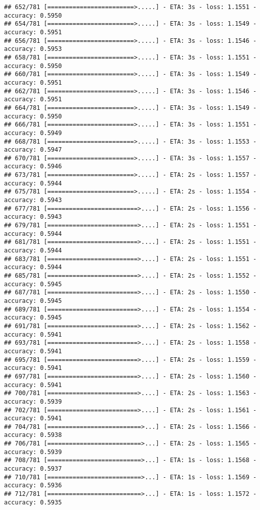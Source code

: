\documentclass[
]{article}
\begin{document}
\begin{verbatim}
## 652/781 [========================>.....] - ETA: 3s - loss: 1.1551 - accuracy: 0.5950
## 654/781 [========================>.....] - ETA: 3s - loss: 1.1549 - accuracy: 0.5951
## 656/781 [========================>.....] - ETA: 3s - loss: 1.1546 - accuracy: 0.5953
## 658/781 [========================>.....] - ETA: 3s - loss: 1.1551 - accuracy: 0.5950
## 660/781 [========================>.....] - ETA: 3s - loss: 1.1549 - accuracy: 0.5951
## 662/781 [========================>.....] - ETA: 3s - loss: 1.1546 - accuracy: 0.5951
## 664/781 [========================>.....] - ETA: 3s - loss: 1.1549 - accuracy: 0.5950
## 666/781 [========================>.....] - ETA: 3s - loss: 1.1551 - accuracy: 0.5949
## 668/781 [========================>.....] - ETA: 3s - loss: 1.1553 - accuracy: 0.5947
## 670/781 [========================>.....] - ETA: 3s - loss: 1.1557 - accuracy: 0.5946
## 673/781 [========================>.....] - ETA: 2s - loss: 1.1557 - accuracy: 0.5944
## 675/781 [========================>.....] - ETA: 2s - loss: 1.1554 - accuracy: 0.5943
## 677/781 [=========================>....] - ETA: 2s - loss: 1.1556 - accuracy: 0.5943
## 679/781 [=========================>....] - ETA: 2s - loss: 1.1551 - accuracy: 0.5944
## 681/781 [=========================>....] - ETA: 2s - loss: 1.1551 - accuracy: 0.5944
## 683/781 [=========================>....] - ETA: 2s - loss: 1.1551 - accuracy: 0.5944
## 685/781 [=========================>....] - ETA: 2s - loss: 1.1552 - accuracy: 0.5945
## 687/781 [=========================>....] - ETA: 2s - loss: 1.1550 - accuracy: 0.5945
## 689/781 [=========================>....] - ETA: 2s - loss: 1.1554 - accuracy: 0.5945
## 691/781 [=========================>....] - ETA: 2s - loss: 1.1562 - accuracy: 0.5941
## 693/781 [=========================>....] - ETA: 2s - loss: 1.1558 - accuracy: 0.5941
## 695/781 [=========================>....] - ETA: 2s - loss: 1.1559 - accuracy: 0.5941
## 697/781 [=========================>....] - ETA: 2s - loss: 1.1560 - accuracy: 0.5941
## 700/781 [=========================>....] - ETA: 2s - loss: 1.1563 - accuracy: 0.5939
## 702/781 [=========================>....] - ETA: 2s - loss: 1.1561 - accuracy: 0.5941
## 704/781 [==========================>...] - ETA: 2s - loss: 1.1566 - accuracy: 0.5938
## 706/781 [==========================>...] - ETA: 2s - loss: 1.1565 - accuracy: 0.5939
## 708/781 [==========================>...] - ETA: 1s - loss: 1.1568 - accuracy: 0.5937
## 710/781 [==========================>...] - ETA: 1s - loss: 1.1569 - accuracy: 0.5936
## 712/781 [==========================>...] - ETA: 1s - loss: 1.1572 - accuracy: 0.5935

\end{verbatim}
\end{document}
